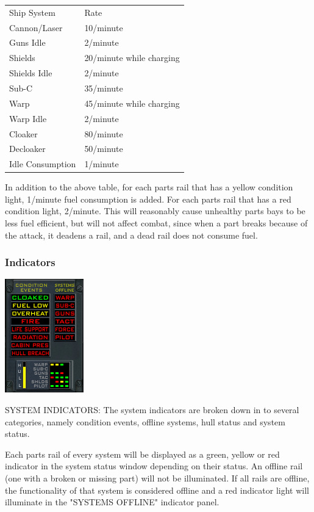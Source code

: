 \begin{itemize}
\begin{tabular}{ | l | l | }
\hline
Ship System & Rate \\
Cannon\slash Laser & 10\slash minute \\
Guns Idle & 2\slash minute \\
Shields & 20\slash minute while charging \\
Shields Idle & 2\slash minute \\
Sub-C & 35\slash minute \\
Warp & 45\slash minute while charging \\
Warp Idle & 2\slash minute \\
Cloaker & 80\slash minute \\
Decloaker & 50\slash minute \\
Idle Consumption & 1\slash minute \\
\hline
\end{tabular}

In addition to the above table, for each parts rail that has a yellow condition light, 1\slash minute fuel consumption is added. For each parts rail that has a red condition light, 2\slash minute.  This will reasonably cause unhealthy parts bays to be less fuel efficient, but will not affect combat, since when a part breaks because of the attack, it deadens a rail, and a dead rail does not consume fuel. 


\subsubsection{Indicators}
\includegraphics[scale=0.70]{images/indicators.png}

SYSTEM INDICATORS: 
The system indicators are broken down in to several categories, namely
condition events, offline systems, hull status and system status.

Each parts rail of every system will be displayed as a green, yellow or red
indicator in the system status window depending on their status.  An
offline rail (one with a broken or missing part) will not be illuminated.
If all rails are offline, the functionality of that system is considered
offline and a red indicator light will illuminate in the "SYSTEMS OFFLINE"
indicator panel.


\end{itemize}
